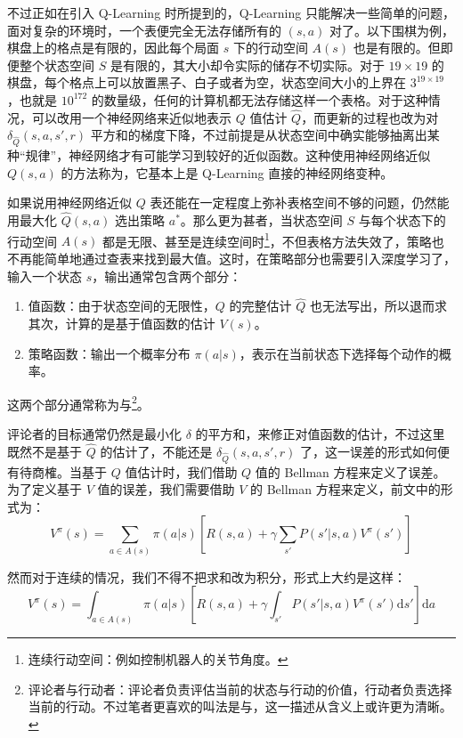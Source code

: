 不过正如在引入 Q-Learning 时所提到的，Q-Learning 只能解决一些简单的问题，面对复杂的环境时，一个表便完全无法存储所有的 $(s, a)$ 对了。以下围棋为例，棋盘上的格点是有限的，因此每个局面 $s$ 下的行动空间 $A(s)$ 也是有限的。但即便整个状态空间 $S$ 是有限的，其大小却令实际的储存不切实际。对于 $19 \times 19$ 的棋盘，每个格点上可以放置黑子、白子或者为空，状态空间大小的上界在 $3^{19 \times 19}$，也就是 $10^{172}$ 的数量级，任何的计算机都无法存储这样一个表格。对于这种情况，可以改用一个神经网络来近似地表示 $Q$ 值估计 $\hat Q$，而更新的过程也改为对 $\delta_{\hat Q} (s, a, s', r)$ 平方和的梯度下降，不过前提是从状态空间中确实能够抽离出某种“规律”，神经网络才有可能学习到较好的近似函数。这种使用神经网络近似 $Q(s, a)$ 的方法称为，它基本上是 Q-Learning 直接的神经网络变种。

如果说用神经网络近似 $Q$ 表还能在一定程度上弥补表格空间不够的问题，仍然能用最大化 $\hat Q(s, a)$ 选出策略 $a^*$。那么更为甚者，当状态空间 $S$ 与每个状态下的行动空间 $A(s)$ 都是无限、甚至是连续空间时\footnote{连续行动空间：例如控制机器人的关节角度。}，不但表格方法失效了，策略也不再能简单地通过查表来找到最大值。这时，在策略部分也需要引入深度学习了，输入一个状态 $s$，输出通常包含两个部分：
\begin{enumerate}
    \item 值函数：由于状态空间的无限性，$Q$ 的完整估计 $\hat Q$ 也无法写出，所以退而求其次，计算的是基于值函数的估计 $V(s)$。
    \item 策略函数：输出一个概率分布 $\pi(a | s)$，表示在当前状态下选择每个动作的概率。
\end{enumerate}

这两个部分通常称为与\footnote{评论者与行动者：评论者负责评估当前的状态与行动的价值，行动者负责选择当前的行动。不过笔者更喜欢的叫法是与，这一描述从含义上或许更为清晰。}。

评论者的目标通常仍然是最小化 $\delta$ 的平方和，来修正对值函数的估计，不过这里既然不是基于 $\hat Q$ 的估计了，不能还是 $\delta_{\hat Q} (s, a, s', r)$ 了，这一误差的形式如何便有待商榷。当基于 $Q$ 值估计时，我们借助 $Q$ 值的 Bellman 方程来定义了误差。为了定义基于 $V$ 值的误差，我们需要借助 $V$ 的 Bellman 方程来定义，前文中的形式为：
\[
    V^\pi (s) = \sum_{a \in A(s)} \pi(a | s) \left[ R(s, a) + \gamma \sum_{s'} P(s' | s, a) V^\pi (s')\right]
\]

然而对于连续的情况，我们不得不把求和改为积分，形式上大约是这样：
\[
    V^\pi (s) = \int_{a \in A(s)} \pi(a | s) \left[ R(s, a) + \gamma \int_{s'} P(s' | s, a) V^\pi (s')\mathrm{d}s'\right] \mathrm{d}a
\]

